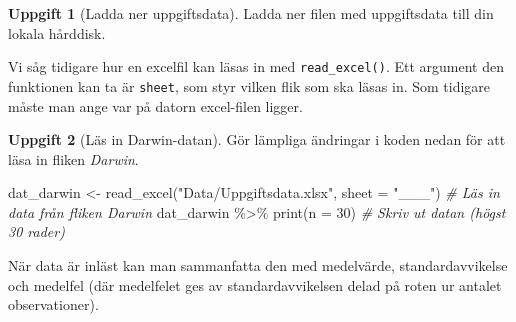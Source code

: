 \documentclass[
]{book}
\newenvironment{Shaded}{\begin{snugshade}}{\end{snugshade}}
\newcommand{\AttributeTok}[1]{\textcolor[rgb]{0.77,0.63,0.00}{#1}}
\newcommand{\CommentTok}[1]{\textcolor[rgb]{0.56,0.35,0.01}{\textit{#1}}}
\newcommand{\DecValTok}[1]{\textcolor[rgb]{0.00,0.00,0.81}{#1}}
\newcommand{\FunctionTok}[1]{\textcolor[rgb]{0.00,0.00,0.00}{#1}}
\newcommand{\NormalTok}[1]{#1}
\newcommand{\OtherTok}[1]{\textcolor[rgb]{0.56,0.35,0.01}{#1}}
\newcommand{\SpecialCharTok}[1]{\textcolor[rgb]{0.00,0.00,0.00}{#1}}
\newcommand{\StringTok}[1]{\textcolor[rgb]{0.31,0.60,0.02}{#1}}
\theoremstyle{definition}
\theoremstyle{definition}
\theoremstyle{definition}
\newtheorem{exercise}{Uppgift}[chapter]
\theoremstyle{definition}
\theoremstyle{remark}
\begin{document}
\begin{exercise}[Ladda ner uppgiftsdata]
Ladda ner filen med uppgiftsdata till din lokala hårddisk.
\end{exercise}

Vi såg tidigare hur en excelfil kan läsas in med \texttt{read\_excel()}. Ett argument den funktionen kan ta är \texttt{sheet}, som styr vilken flik som ska läsas in. Som tidigare måste man ange var på datorn excel-filen ligger.

\begin{exercise}[Läs in Darwin-datan]

Gör lämpliga ändringar i koden nedan för att läsa in fliken \emph{Darwin}.

\begin{Shaded}
\begin{Highlighting}[]
\NormalTok{dat\_darwin }\OtherTok{\textless{}{-}} \FunctionTok{read\_excel}\NormalTok{(}\StringTok{"Data/Uppgiftsdata.xlsx"}\NormalTok{, }\AttributeTok{sheet =} \StringTok{"\_\_\_"}\NormalTok{)         }\CommentTok{\# Läs in data från fliken Darwin}
\NormalTok{dat\_darwin }\SpecialCharTok{\%\textgreater{}\%} \FunctionTok{print}\NormalTok{(}\AttributeTok{n =} \DecValTok{30}\NormalTok{)                                              }\CommentTok{\# Skriv ut datan (högst 30 rader)}
\end{Highlighting}
\end{Shaded}

\end{exercise}

När data är inläst kan man sammanfatta den med medelvärde, standardavvikelse och medelfel (där medelfelet ges av standardavvikelsen delad på roten ur antalet observationer).
\end{document}
